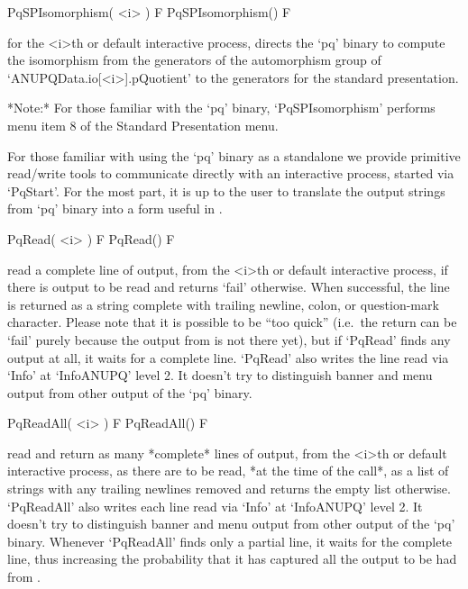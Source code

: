 \>PqSPIsomorphism( <i> ) F
\>PqSPIsomorphism() F

for the <i>th or default interactive {\ANUPQ} process, directs  the  `pq'
binary to compute the isomorphism from the generators of the automorphism
group of `ANUPQData.io[<i>].pQuotient' to the generators for the standard
presentation.

*Note:* For  those  familiar  with  the  `pq'  binary,  `PqSPIsomorphism'
performs menu item 8 of the Standard Presentation menu.


For those familiar with using the `pq' binary as a standalone we  provide
primitive read/write tools to communicate directly  with  an  interactive
{\ANUPQ} process, started via `PqStart'. For the most part, it is  up  to
the user to translate the output strings from `pq'  binary  into  a  form
useful in {\GAP}.

\>PqRead( <i> ) F
\>PqRead() F

read a complete line of  {\ANUPQ}  output,  from  the  <i>th  or  default
interactive {\ANUPQ} process, if there is output to be read  and  returns
`fail' otherwise. When successful, the  line  is  returned  as  a  string
complete with trailing newline, colon, or question-mark character. Please
note that it is possible to be ``too  quick''  (i.e.~the  return  can  be
`fail' purely because the output from {\ANUPQ} is not there yet), but  if
`PqRead' finds any output at all, it waits for a complete line.  `PqRead'
also writes the line read via `Info' at `InfoANUPQ' level 2.  It  doesn't
try to distinguish banner and menu output from other output of  the  `pq'
binary.

\>PqReadAll( <i> ) F
\>PqReadAll() F

read and return as many *complete* lines of  {\ANUPQ}  output,  from  the
<i>th or default interactive {\ANUPQ} process, as there are to  be  read,
*at the time of the call*,  as  a  list  of  strings  with  any  trailing
newlines removed and returns the empty list otherwise.  `PqReadAll'  also
writes each line read via `Info' at `InfoANUPQ' level 2. It  doesn't  try
to distinguish banner and menu output  from  other  output  of  the  `pq'
binary. Whenever `PqReadAll' finds only a partial line, it waits for  the
complete line, thus increasing the probability that it has  captured  all
the output to be had from {\ANUPQ}.

